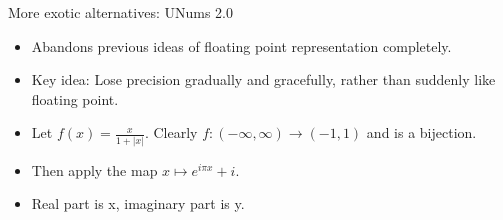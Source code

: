 \documentclass{beamer}
\begin{document}
\begin{frame}{More exotic alternatives: UNums 2.0}
\begin{itemize}
\item Abandons previous ideas of floating point representation completely. 
\item Key idea: Lose precision gradually and gracefully, rather than suddenly like floating point.
\item Let $f(x) = \frac{x}{1 + |x|}$. Clearly $f: (-\infty, \infty) \to (-1, 1)$ and is a bijection.
\item Then apply the map $x \mapsto e^{i \pi x} + i$.

\begin{minipage}{\textwidth}\centering
{}
\end{minipage}

\item Real part is x, imaginary part is y.
\end{itemize}
\end{frame}
\end{document}
